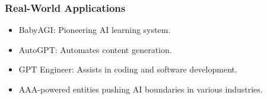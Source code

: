 \begin{frame}[fragile]\frametitle{Real-World Applications}

  \begin{itemize}
    \item BabyAGI: Pioneering AI learning system.
    \item AutoGPT: Automates content generation.
    \item GPT Engineer: Assists in coding and software development.
    \item AAA-powered entities pushing AI boundaries in various industries.
  \end{itemize}
\end{frame}

